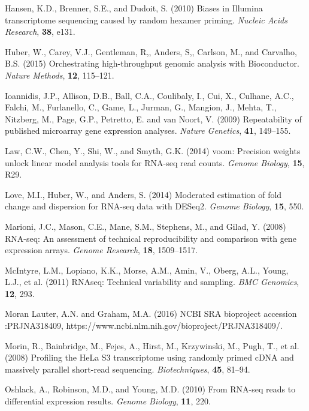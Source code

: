 \documentclass{bioinfo}
\begin{document}
\begin{thebibliography}{}
Hansen, K.D., Brenner, S.E., and Dudoit, S. (2010) Biases in Illumina transcriptome sequencing caused by random hexamer priming. {\it Nucleic Acids Research}, {\bf 38}, e131.

Huber, W., Carey, V.J., Gentleman, R,, Anders, S,, Carlson, M., and Carvalho, B.S. (2015) Orchestrating high-throughput genomic analysis with Bioconductor. {\it Nature Methods}, {\bf 12}, 115--121.

Ioannidis, J.P., Allison, D.B., Ball, C.A., Coulibaly, I., Cui, X., Culhane, A.C., Falchi, M., Furlanello, C., Game, L., Jurman, G., Mangion, J., Mehta, T., Nitzberg, M., Page, G.P., Petretto, E. and van Noort, V. (2009) Repeatability of published microarray gene expression analyses. {\it Nature Genetics}, {\bf 41}, 149--155.

Law, C.W., Chen, Y., Shi, W., and Smyth, G.K. (2014) voom: Precision weights unlock linear model analysis tools for RNA-seq read counts. {\it Genome Biology}, {\bf 15}, R29.

Love, M.I., Huber, W., and Anders, S. (2014) Moderated estimation of fold change and dispersion for RNA-seq data with DESeq2. {\it Genome Biology}, {\bf 15}, 550.

Marioni, J.C., Mason, C.E., Mane, S.M., Stephens, M., and Gilad, Y. (2008) RNA-seq: An assessment of technical reproducibility and comparison with gene expression arrays. {\it Genome Research}, {\bf 18}, 1509--1517.

McIntyre, L.M., Lopiano, K.K., Morse, A.M., Amin, V., Oberg, A.L., Young, L.J., et al. (2011) RNAseq: Technical variability and sampling. {\it BMC Genomics}, {\bf 12}, 293.

Moran Lauter, A.N. and Graham, M.A. (2016) NCBI SRA bioproject accession :PRJNA318409, https://www.ncbi.nlm.nih.gov/bioproject/PRJNA318409/.

Morin, R., Bainbridge, M., Fejes, A., Hirst, M., Krzywinski, M., Pugh, T., et al. (2008) Profiling the HeLa S3 transcriptome using randomly primed cDNA and massively parallel short-read sequencing. {\it Biotechniques}, {\bf 45}, 81--94.

Oshlack, A., Robinson, M.D., and Young, M.D. (2010) From RNA-seq reads to differential expression results.
{\it Genome Biology}, {\bf 11}, 220.


\end{thebibliography}
\end{document}
